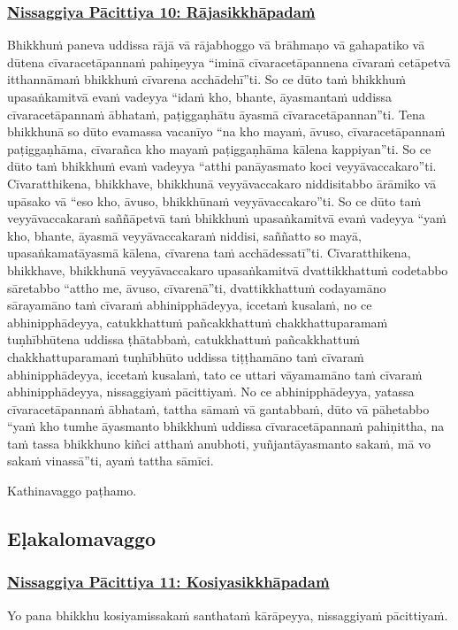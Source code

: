 \subsubsection*{\hyperref[forf-exp10]{Nissaggiya Pācittiya 10: Rājasikkhāpadaṁ}}
\label{np10}
Bhikkhuṁ paneva uddissa rājā vā rājabhoggo vā brāhmaṇo vā gahapatiko vā dūtena cīvaracetāpannaṁ pahiṇeyya “iminā cīvaracetāpannena cīvaraṁ cetāpetvā itthannāmaṁ bhikkhuṁ cīvarena acchādehī”ti. So ce dūto taṁ bhikkhuṁ upasaṅkamitvā evaṁ vadeyya “idaṁ kho, bhante, āyasmantaṁ uddissa cīvaracetāpannaṁ ābhataṁ, paṭiggaṇhātu āyasmā cīvaracetāpannan''ti. Tena bhikkhunā so dūto evamassa vacanīyo “na kho mayaṁ, āvuso, cīvaracetāpannaṁ paṭiggaṇhāma, cīvarañca kho mayaṁ paṭiggaṇhāma kālena kappiyan''ti. So ce dūto taṁ bhikkhuṁ evaṁ vadeyya “atthi panāyasmato koci veyyāvaccakaro”ti. Cīvaratthikena, bhikkhave, bhikkhunā veyyāvaccakaro niddisitabbo ārāmiko vā upāsako vā “eso kho, āvuso, bhikkhūnaṁ veyyāvaccakaro”ti. So ce dūto taṁ veyyāvaccakaraṁ saññāpetvā taṁ bhikkhuṁ upasaṅkamitvā evaṁ vadeyya “yaṁ kho, bhante, āyasmā veyyāvaccakaraṁ niddisi, saññatto so mayā, upasaṅkamatāyasmā kālena, cīvarena taṁ acchādessatī”ti. Cīvaratthikena, bhikkhave, bhikkhunā veyyāvaccakaro upasaṅkamitvā dvattikkhattuṁ codetabbo sāretabbo “attho me, āvuso, cīvarenā”ti, dvattikkhattuṁ codayamāno sārayamāno taṁ cīvaraṁ abhinipphādeyya, iccetaṁ kusalaṁ, no ce abhinipphādeyya, catukkhattuṁ pañcakkhattuṁ chakkhattuparamaṁ tuṇhībhūtena uddissa ṭhātabbaṁ, catukkhattuṁ pañcakkhattuṁ chakkhattuparamaṁ tuṇhībhūto uddissa tiṭṭhamāno taṁ cīvaraṁ abhinipphādeyya, iccetaṁ kusalaṁ, tato ce uttari vāyamamāno taṁ cīvaraṁ abhinipphādeyya, nissaggiyaṁ pācittiyaṁ. No ce abhinipphādeyya, yatassa cīvaracetāpannaṁ ābhataṁ, tattha sāmaṁ vā gantabbaṁ, dūto vā pāhetabbo “yaṁ kho tumhe āyasmanto bhikkhuṁ uddissa cīvaracetāpannaṁ pahiṇittha, na taṁ tassa bhikkhuno kiñci atthaṁ anubhoti, yuñjantāyasmanto sakaṁ, mā vo sakaṁ vinassā”ti, ayaṁ tattha sāmīci.

\begin{center}
  Kathinavaggo paṭhamo.
\end{center}

\subsection{Eḷakalomavaggo}
\vspace{0.2cm}

\subsubsection*{\hyperref[forf-exp11]{Nissaggiya Pācittiya 11: Kosiyasikkhāpadaṁ}}
\label{np11}
Yo pana bhikkhu kosiyamissakaṁ santhataṁ kārāpeyya, nissaggiyaṁ pācittiyaṁ.

